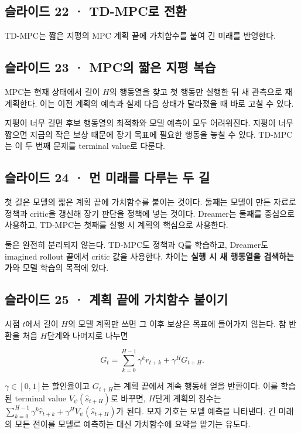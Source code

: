\documentclass[11pt,a4paper]{article}
\begin{document}
\subsection{슬라이드 22 · TD-MPC로 전환}

TD-MPC는 짧은 지평의 MPC 계획 끝에 가치함수를 붙여 긴 미래를 반영한다.\par

\subsection{슬라이드 23 · MPC의 짧은 지평 복습}

MPC는 현재 상태에서 길이 $H$의 행동열을 찾고 첫 행동만 실행한 뒤 새 관측으로 재계획한다. 이는 이전 계획의 예측과 실제 다음 상태가 달라졌을 때 바로 고칠 수 있다.\par

지평이 너무 길면 후보 행동열의 최적화와 모델 예측이 모두 어려워진다. 지평이 너무 짧으면 지금의 작은 보상 때문에 장기 목표에 필요한 행동을 놓칠 수 있다. TD-MPC는 이 두 번째 문제를 terminal value로 다룬다.\par

\subsection{슬라이드 24 · 먼 미래를 다루는 두 길}

첫 길은 모델의 짧은 계획 끝에 가치함수를 붙이는 것이다. 둘째는 모델이 만든 자료로 정책과 critic을 갱신해 장기 판단을 정책에 넣는 것이다. Dreamer는 둘째를 중심으로 사용하고, TD-MPC는 첫째를 실행 시 계획의 핵심으로 사용한다.\par

둘은 완전히 분리되지 않는다. TD-MPC도 정책과 Q를 학습하고, Dreamer도 imagined rollout 끝에서 critic 값을 사용한다. 차이는 \textbf{실행 시 새 행동열을 검색하는가}와 모델 학습의 목적에 있다.\par

\subsection{슬라이드 25 · 계획 끝에 가치함수 붙이기}

시점 $t$에서 길이 $H$의 모델 계획만 쓰면 그 이후 보상은 목표에 들어가지 않는다. 참 반환을 처음 $H$단계와 나머지로 나누면\par

\[
G_t=\sum_{k=0}^{H-1}\gamma^k r_{t+k}
+\gamma^H G_{t+H}.
\]

$\gamma\in[0,1]$는 할인율이고 $G_{t+H}$는 계획 끝에서 계속 행동해 얻을 반환이다. 이를 학습된 terminal value $V_\psi(\hat s_{t+H})$로 바꾸면, $H$단계 계획의 점수는 $\sum_{k=0}^{H-1}\gamma^k\hat r_{t+k}+\gamma^H V_\psi(\hat s_{t+H})$가 된다. 모자 기호는 모델 예측을 나타낸다. 긴 미래의 모든 전이를 모델로 예측하는 대신 가치함수에 요약을 맡기는 유도다.\par
\end{document}
